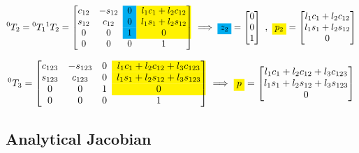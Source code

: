 
\begin{equation*}
	{}^0T_2
	=
	{}^0T_1 {}^1T_2
	=
	\begin{bmatrix}
		c_{12} & -s_{12} & \cellcolor{cyan}0 & \cellcolor{yellow}l_1 c_1 + l_2c_{12}\\
		s_{12} & c_{12} & \cellcolor{cyan}0 & \cellcolor{yellow}l_1 s_1 + l_2s_{12}\\
		0 & 0 & \cellcolor{cyan}1 & \cellcolor{yellow}0 \\
		0 & 0 & 0 & 1 \\
	\end{bmatrix}
	\implies
	\colorbox{cyan}{$z_2$}
	=
	\begin{bmatrix}
		0 \\ 0 \\ 1
	\end{bmatrix}
	\ , \
	\colorbox{yellow}{$p_2$}
	=
	\begin{bmatrix}
		l_1 c_1 + l_2c_{12} \\ l_1 s_1 + l_2s_{12} \\ 0
	\end{bmatrix}
\end{equation*}

\begin{equation*}
	{}^0T_3
	=
	\begin{bmatrix}
		c_{123} & -s_{123} & 0 & \cellcolor{yellow}l_1 c_1 + l_2c_{12} + l_3c_{123}\\
		s_{123} & c_{123} & 0 & \cellcolor{yellow}l_1 s_1 + l_2s_{12} + l_3s_{123}\\
		0 & 0 & 1 & \cellcolor{yellow}0 \\
		0 & 0 & 0 & 1 \\
	\end{bmatrix}
	\implies
	\colorbox{yellow}{$p$}
	=
	\begin{bmatrix}
		l_1 c_1 + l_2c_{12} + l_3c_{123} \\ l_1 s_1 + l_2s_{12} + l_3s_{123} \\ 0
	\end{bmatrix}
\end{equation*}





\subsection{Analytical Jacobian}

